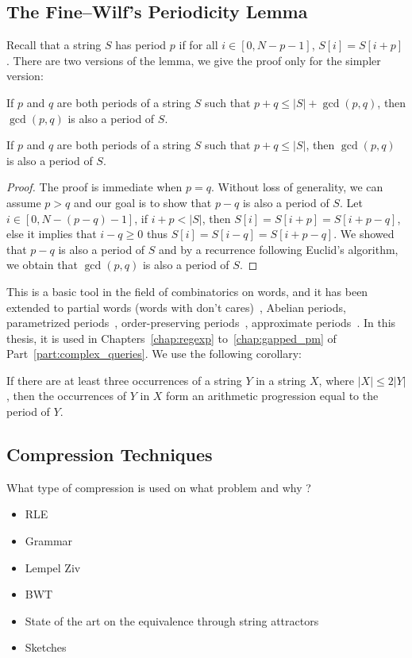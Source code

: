 \subsection{The Fine--Wilf's Periodicity Lemma}\label{sec:prelim:FW}

Recall that a string $S$ has period $p$ if for all $i \in [0,N-p-1]$, $S[i]=S[i+p]$. There are two versions of the lemma, we give the proof only for the simpler version:

\begin{lemma}
If $p$ and $q$ are both periods of a string $S$ such that $p+q \leq |S|+\gcd(p,q)$, then $\gcd(p,q)$ is also a period of $S$.
\end{lemma}

\begin{lemma}
    If $p$ and $q$ are both periods of a string $S$ such that $p+q \leq |S|$, then $\gcd(p,q)$ is also a period of $S$.
\end{lemma}
\begin{proof}
    The proof is immediate when $p=q$. Without loss of generality, we can assume $p > q$ and our goal is to show that $p-q$ is also a period of $S$. Let $i\in[0,N-(p-q)-1]$, if $i+p < |S|$, then $S[i]=S[i+p]=S[i+p-q]$, else it implies that $i-q \geq 0$ thus $S[i] = S[i-q] = S[i+p-q]$. We showed that $p-q$ is also a period of $S$ and by a recurrence following Euclid's algorithm, we obtain that $\gcd(p,q)$ is also a period of $S$.
\end{proof}


This is a basic tool in the field of combinatorics on words, and it has been extended to partial words (words with don't cares)~\cite{Berstel1999,Blanchet-Sadri2008,Blanchet-Sadri2002,Shur2004,Shur2001,Idiatulina2014,Kociumaka2022},
Abelian periods\cite{Constantinescu2006,Blanchet-Sadri2013}, parametrized periods~\cite{Apostolico2008},
order-preserving periods~\cite{Matsuoka2016,Gourdel2020}, approximate periods~\cite{Amir2010,Amir2012,Amir2015}.
In this thesis, it is used in Chapters~\ref{chap:regexp} to~\ref{chap:gapped_pm} of Part~\ref{part:complex_queries}. We use the following corollary:

\begin{corollary}
    If there are at least three occurrences of a string $Y$ in a string $X$, where $|X| \leq 2|Y|$, then the occurrences of $Y$ in $X$ form an arithmetic progression equal to the period of $Y$. 
\end{corollary}

\subsection{Compression Techniques}\label{sec:prelim:compress}
What type of compression is used on what problem and why ?
\begin{itemize}
\item RLE
\item Grammar
\item Lempel Ziv
\item BWT
\item State of the art on the equivalence through string attractors
\item Sketches
\end{itemize}